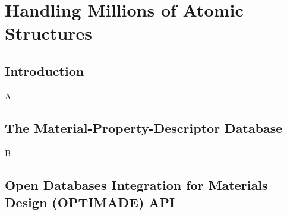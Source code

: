\chapter{Handling Millions of Atomic Structures} \label{chap:mpdd}

\section{Introduction} \label{mpdd:sec:background}

A


\section{The Material-Property-Descriptor Database} \label{mpdd:sec:mpdd}


B



\section{Open Databases Integration for Materials Design (OPTIMADE) API} \label{mpdd:sec:optimade}


\printbibliography[heading=subbibintoc]